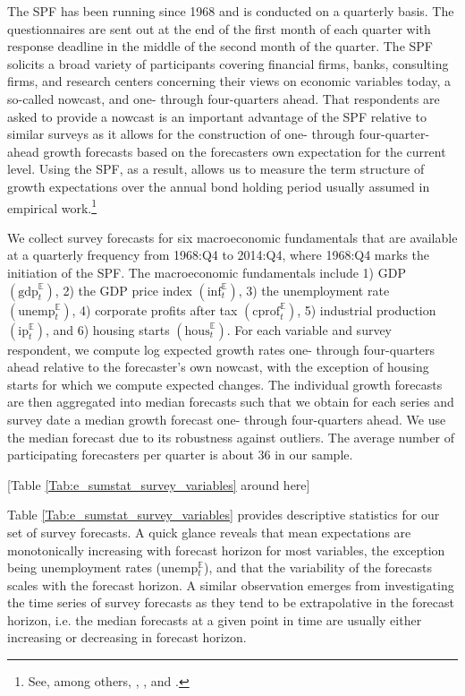 \documentclass[12pt,letterpaper,leqno,doublespacing]{article}
\begin{document}
The SPF has been running since 1968 and is conducted on a quarterly basis. The questionnaires are sent out at the end of the first month of each quarter with response deadline in the middle of the second month of the quarter. The SPF solicits a broad variety of participants covering financial firms, banks, consulting firms, and research centers concerning their views on economic variables today, a so-called nowcast, and one- through four-quarters ahead. That respondents are asked to provide a nowcast is an important advantage of the SPF relative to similar surveys as it allows for the construction of one- through four-quarter-ahead growth forecasts based on the forecasters own expectation for the current level. Using the SPF, as a result, allows us to measure the term structure of growth expectations over the annual bond holding period usually assumed in empirical work.\footnote{See, among others, \cite{CochranePiazzesi2005}, \cite{LudvigsonNg2009}, and \cite{ThorntonValente2012}.} 

We collect survey forecasts for six macroeconomic fundamentals that are available at a quarterly frequency from 1968:Q4 to 2014:Q4, where 1968:Q4 marks the initiation of the SPF. The macroeconomic fundamentals include 1) GDP $\left(\text{gdp}_{t}^{\mathbb{E}}\right)$, 2) the GDP price index $\left(\text{inf}_{t}^{\mathbb{E}}\right)$, 3) the unemployment rate $\left(\text{unemp}_{t}^{\mathbb{E}}\right)$, 4) corporate profits after tax $\left(\text{cprof}_{t}^{\mathbb{E}}\right)$, 5) industrial production $\left(\text{ip}_{t}^{\mathbb{E}}\right)$, and 6) housing starts $\left(\text{hous}_{t}^{\mathbb{E}}\right)$. For each variable and survey respondent, we compute log expected growth rates one- through four-quarters ahead relative to the forecaster's own nowcast, with the exception of housing starts for which we compute expected changes. The individual growth forecasts are then aggregated into median forecasts such that we obtain for each series and survey date a median growth forecast one- through four-quarters ahead. We use the median forecast due to its robustness against outliers. The average number of participating forecasters per quarter is about $36$ in our sample. 

\begin{center}
    [Table \ref{Tab:e_sumstat_survey_variables} around here]
\end{center}

Table \ref{Tab:e_sumstat_survey_variables} provides descriptive statistics for our set of survey forecasts. A quick glance reveals that mean expectations are monotonically increasing with forecast horizon for most variables, the exception being unemployment rates (unemp$_{t}^{\mathbb{E}}$), and that the variability of the forecasts scales with the forecast horizon. A similar observation emerges from investigating the time series of survey forecasts as they tend to be extrapolative in the forecast horizon, i.e. the median forecasts at a given point in time are usually either increasing or decreasing in forecast horizon.
\end{document}

